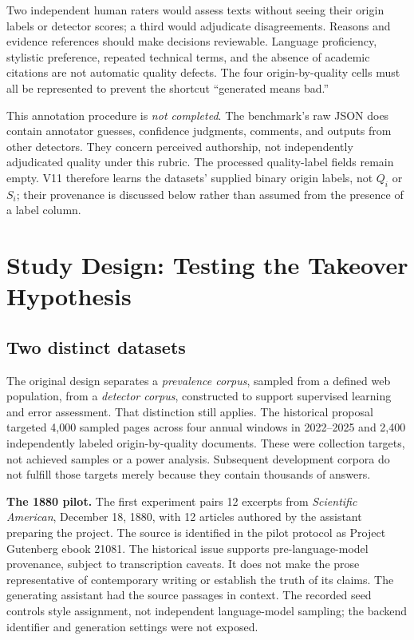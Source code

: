 \documentclass[11pt]{article}
\begin{document}
Two independent human raters would assess texts without seeing their origin
labels or detector scores; a third would adjudicate disagreements. Reasons
and evidence references should make decisions reviewable. Language proficiency,
stylistic preference, repeated technical terms, and the absence of academic
citations are not automatic quality defects. The four origin-by-quality cells
must all be represented to prevent the shortcut ``generated means bad.''

This annotation procedure is \emph{not completed}. The benchmark's raw JSON
does contain annotator guesses, confidence judgments, comments, and outputs
from other detectors. They concern perceived authorship, not independently
adjudicated quality under this rubric. The processed quality-label fields
remain empty. V11 therefore learns the datasets' supplied binary origin
labels, not $Q_i$ or $S_i$; their provenance is discussed below rather than
assumed from the presence of a label column.

\section{Study Design: Testing the Takeover Hypothesis}
\subsection{Two distinct datasets}
The original design separates a \emph{prevalence corpus}, sampled from a
defined web population, from a \emph{detector corpus}, constructed to support
supervised learning and error assessment. That distinction still applies.
The historical proposal targeted 4,000 sampled pages across four annual
windows in 2022--2025 and 2,400 independently labeled origin-by-quality
documents. These were collection targets, not achieved samples or a power
analysis. Subsequent development corpora do not fulfill those targets merely
because they contain thousands of answers.

\textbf{The 1880 pilot.} The first experiment pairs 12 excerpts from
\emph{Scientific American}, December 18, 1880, with 12 articles authored by
the assistant preparing the project. The source is identified in the pilot
protocol as Project Gutenberg ebook 21081. The historical issue supports
pre-language-model provenance, subject to transcription caveats. It does not
make the prose representative of contemporary writing or establish the truth
of its claims. The generating assistant had the source passages in context.
The recorded seed controls style assignment, not independent language-model
sampling; the backend identifier and generation settings were not exposed.
\end{document}
